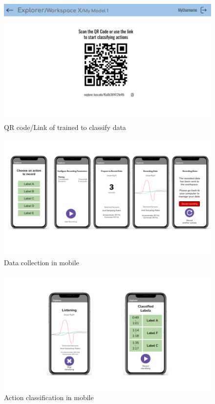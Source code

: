 \begin{figure}[ht]
    \centering
    \includegraphics[width = .98\textwidth]{mockups/11.png}
    \caption{\gls{QR code}/Link of trained  to classify data}
    \label{fig:model-link}
\end{figure}

\begin{figure}[ht]
    \centering
    \includegraphics[width = .98\textwidth]{mockups/12.png}
    \caption{Data collection in mobile}
    \label{fig:data-collection}
\end{figure}

\begin{figure}[ht]
    \centering
    \includegraphics[width = .98\textwidth]{mockups/13.png}
    \caption{Action classification in mobile}
    \label{fig:classification}
\end{figure}